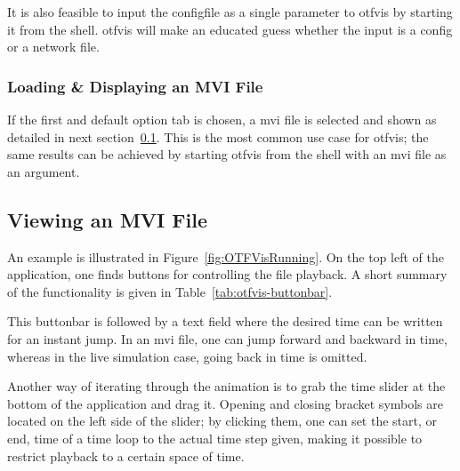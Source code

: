 It is also feasible to input the \gls{configfile} as a single parameter to \gls{otfvis} by starting it from the shell. \gls{otfvis} will make an educated guess whether the input is a config or a network file.

\subsubsection{Loading \& Displaying an MVI File}
If the first and default option tab is chosen, a \gls{mvi} file is selected and shown as detailed in next section~\ref{sec:otfvis-viewing-an-mvi-file}. This is the most common use case for \gls{otfvis}; the same results can be achieved by starting \gls{otfvis} from the shell with an \gls{mvi} file as an argument.

\subsection{Viewing an MVI File}
\label{sec:otfvis-viewing-an-mvi-file}
An example is illustrated in Figure~\ref{fig:OTFVisRunning}. On the top left of the application, one finds buttons for controlling the file playback. A short summary of the functionality is given in Table~\ref{tab:otfvis-buttonbar}.

This buttonbar is followed by a text field where the desired time can be written for an instant jump. In an \gls{mvi} file, one can jump forward and backward in time, whereas in the live simulation case, going back in time is omitted.

Another way of iterating through the animation is to grab the time slider at the bottom of the application and drag it. 
Opening and closing bracket symbols are located on the left side of the slider; 
by clicking them, one can set the start, or end, time of a time loop to the actual time step given, making 
it possible to restrict playback to a certain space of time.


